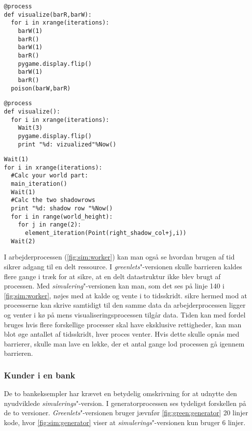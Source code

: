 \begin{lstlisting}[firstnumber=157 ,float=hbtp, label=fig:green:visualize, caption=\code{Greenlets}"-versionen af visualize]
@process
def visualize(barR,barW):
  for i in xrange(iterations):
    barW(1)
    barR()
    barW(1)
    barR()
    pygame.display.flip()
    barW(1)
    barR()
  poison(barW,barR)     
\end{lstlisting}

\begin{lstlisting}[firstnumber=144 ,float=hbtp, label=fig:sim:visualize, caption=\code{simulerings}"-versionen af visualize]
@process
def visualize():
  for i in xrange(iterations):
    Wait(3)  
    pygame.display.flip()
    print "%d: vizualized"%Now()
\end{lstlisting}

\begin{lstlisting}[firstnumber=130 ,float=hbtp, label=fig:sim:worker, caption=Uddrag af arbejderprocessen i simulering]
Wait(1)
for i in xrange(iterations):
  #Calc your world part:
  main_iteration()
  Wait(1)
  #Calc the two shadowrows
  print "%d: shadow row "%Now()
  for i in range(world_height):
    for j in range(2):
      element_iteration(Point(right_shadow_col+j,i))
  Wait(2)
\end{lstlisting}

I arbejderprocessen (\cref{fig:sim:worker}) kan man også se hvordan brugen af tid  sikrer adgang til en delt ressource. I  \emph{greenlets}"-versionen skulle barrieren  kaldes flere gange i træk for at sikre, at en delt datastruktur ikke blev brugt af processen. Med \emph{simulering}"-versionen kan man, som det ses på linje 140 i \cref{fig:sim:worker}, nøjes med at kalde  og vente i to tidsskridt. 
 sikre hermed mod at processerne kan skrive samtidigt til den samme data da arbejderprocessen ligger og venter i kø på  mens visualiseringsprocessen tilgår data. Tiden kan med fordel bruges hvis flere forskellige processer skal have eksklusive rettigheder, kan man blot øge antallet af tidsskridt, hver proces venter. Hvis dette skulle opnås med barrierer, skulle man lave en løkke, der et antal gange lod processen gå igennem barrieren.

\subsubsection{Kunder i en bank}
De to bankeksempler har krævet en betydelig omskrivning for at udnytte den nyudviklede \emph{simulerings}"-version. I generatorprocessen ses tydeligst forskellen på de to versioner. \emph{Greenlets}"-versionen bruger jævnfør \cref{fig:green:generator} 20 linjer kode, hvor \cref{fig:sim:generator} viser at \emph{simulerings}"-versionen kun bruger 6 linjer. 

